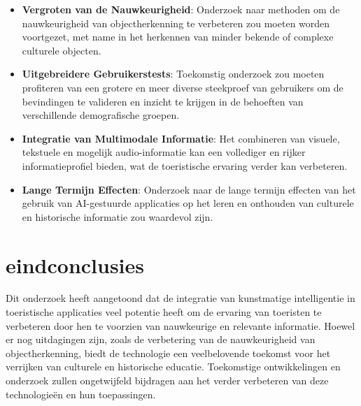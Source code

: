 \begin{itemize}
    \item \textbf{Vergroten van de Nauwkeurigheid}: Onderzoek naar methoden om de nauwkeurigheid van objectherkenning te verbeteren zou moeten worden voortgezet, met name in het herkennen van minder bekende of complexe culturele objecten.
    \item \textbf{Uitgebreidere Gebruikerstests}: Toekomstig onderzoek zou moeten profiteren van een grotere en meer diverse steekproef van gebruikers om de bevindingen te valideren en inzicht te krijgen in de behoeften van verschillende demografische groepen.
    \item \textbf{Integratie van Multimodale Informatie}: Het combineren van visuele, tekstuele en mogelijk audio-informatie kan een vollediger en rijker informatieprofiel bieden, wat de toeristische ervaring verder kan verbeteren.
    \item \textbf{Lange Termijn Effecten}: Onderzoek naar de lange termijn effecten van het gebruik van AI-gestuurde applicaties op het leren en onthouden van culturele en historische informatie zou waardevol zijn.
\end{itemize}
\section{eindconclusies}
Dit onderzoek heeft aangetoond dat de integratie van kunstmatige intelligentie in toeristische applicaties veel potentie heeft om de ervaring van toeristen te verbeteren door hen te voorzien van nauwkeurige en relevante informatie. Hoewel er nog uitdagingen zijn, zoals de verbetering van de nauwkeurigheid van objectherkenning, biedt de technologie een veelbelovende toekomst voor het verrijken van culturele en historische educatie. Toekomstige ontwikkelingen en onderzoek zullen ongetwijfeld bijdragen aan het verder verbeteren van deze technologieën en hun toepassingen.
